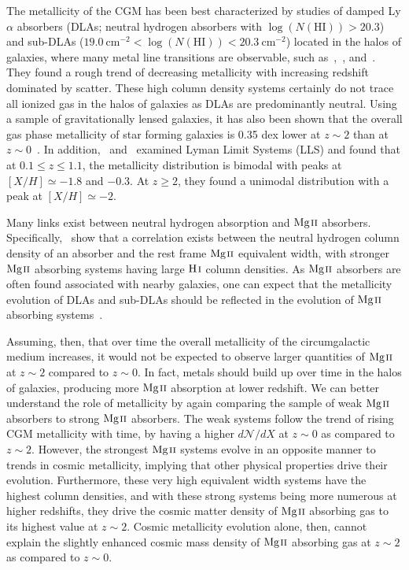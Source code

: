 \documentclass[iop,apj,numberedappendix,appendixfloats,twocolappendix]{emulateapj}
\begin{document}
The metallicity of the CGM has been best characterized by studies of damped Ly$\alpha$ absorbers (DLAs; neutral hydrogen absorbers with $\log(N(\mathrm{HI})) > 20.3$) and sub-DLAs ($19.0~\mathrm{cm^{-2}} < \log(N(\mathrm{HI})) < 20.3~\mathrm{cm^{-2}}$) located in the halos of galaxies, where many metal line transitions are observable, such as~\cite{Rafelski2012},~\cite{Quiret2016}, and~\cite{Jorgenson2013}. They found a rough trend of decreasing metallicity with increasing redshift dominated by scatter. These high column density systems certainly do not trace all ionized gas in the halos of galaxies as DLAs are predominantly neutral. Using a sample of gravitationally lensed galaxies, it has also been shown that the overall gas phase metallicity of star forming galaxies is 0.35 dex lower at $z \sim 2$ than at $z \sim 0$~\citep{Yuan2013}. In addition,~\cite{Wotta2016} and~\cite{Lehner2016} examined Lyman Limit Systems (LLS) and found that at $0.1 \le z \le 1.1$, the metallicity distribution is bimodal with peaks at $[X/H] \simeq -1.8$ and $-0.3$. At $z \ge 2$, they found a unimodal distribution with a peak at $[X/H] \simeq -2$.

Many links exist between neutral hydrogen absorption and ${\hbox{{\rm Mg}\kern 0.1em{\sc ii}}}$ absorbers. Specifically,~\cite{Menard2009} show that a correlation exists between the neutral hydrogen column density of an absorber and the rest frame ${\hbox{{\rm Mg}\kern 0.1em{\sc ii}}}$ equivalent width, with stronger ${\hbox{{\rm Mg}\kern 0.1em{\sc ii}}}$ absorbing systems having large ${\hbox{{\rm H}\kern 0.1em{\sc i}}}$ column densities. As ${\hbox{{\rm Mg}\kern 0.1em{\sc ii}}}$ absorbers are often found associated with nearby galaxies, one can expect that the metallicity evolution of DLAs and sub-DLAs should be reflected in the evolution of ${\hbox{{\rm Mg}\kern 0.1em{\sc ii}}}$ absorbing systems~\citep{Kulkarni2002,Prochaska2003,Kulkarni2005,Kulkarni2007}.

Assuming, then, that over time the overall metallicity of the circumgalactic medium increases, it would not be expected to observe larger quantities of ${\hbox{{\rm Mg}\kern 0.1em{\sc ii}}}$ at $z \sim 2$ compared to $z \sim 0$. In fact, metals should build up over time in the halos of galaxies, producing more ${\hbox{{\rm Mg}\kern 0.1em{\sc ii}}}$ absorption at lower redshift. We can better understand the role of metallicity by again comparing the sample of weak ${\hbox{{\rm Mg}\kern 0.1em{\sc ii}}}$ absorbers to strong ${\hbox{{\rm Mg}\kern 0.1em{\sc ii}}}$ absorbers. The weak systems follow the trend of rising CGM metallicity with time, by having a higher $d\mathcal{N}\!/dX$ at $z \sim 0$ as compared to $z \sim 2$. However, the strongest ${\hbox{{\rm Mg}\kern 0.1em{\sc ii}}}$ systems evolve in an opposite manner to trends in cosmic metallicity, implying that other physical properties drive their evolution. Furthermore, these very high equivalent width systems have the highest column densities, and with these strong systems being more numerous at higher redshifts, they drive the cosmic matter density of ${\hbox{{\rm Mg}\kern 0.1em{\sc ii}}}$ absorbing gas to its highest value at $z \sim 2$. Cosmic metallicity evolution alone, then, cannot explain the slightly enhanced cosmic mass density of ${\hbox{{\rm Mg}\kern 0.1em{\sc ii}}}$ absorbing gas at $z \sim 2$ as compared to $z \sim 0$.
\end{document}

